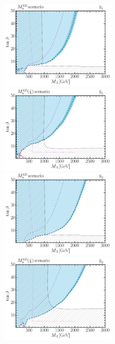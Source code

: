 \documentclass[../report.tex]{subfiles}
\begin{document}
\begin{figure}
\begin{center}
\includegraphics[width=0.5\textwidth]{section9/mh125S1_HBHS}\hfill
\includegraphics[width=0.5\textwidth]{section9/mh125-lc_S1_HBHS}\\
\includegraphics[width=0.5\textwidth]{section9/mh125S2_HBHS}\hfill
\includegraphics[width=0.5\textwidth]{section9/mh125-lc_S2_HBHS}


\end{center}
\end{figure}
\end{document}
